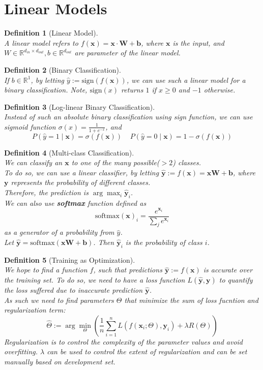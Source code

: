 \documentclass[12pt]{article}
\newtheorem{definition}{Definition}[section]
\theoremstyle{definition}
\newcommand{\x}{\mathbf{x}}
\newcommand{\y}{\mathbf{y}}
\begin{document}
\section{Linear Models}
\begin{definition}[Linear Model]
\hfill\\\normalfont A linear model refers to $f(\x) = \x\cdot \mathbf{W} + \mathbf{b}$, where $\x$ is the input, and $W\in\mathbb{R}^{d_{in}\times d_{out}}, b\in\mathbb{R}^{d_{out}}$ are parameter of the linear model.
\end{definition}
\begin{definition}[Binary Classification]
\hfill\\\normalfont If $b\in\mathbb{R}^1$, by letting $\hat{y}:=\text{sign}(f(\x))$, we can use such a linear model for a binary classification. Note, $\text{sign}(x)$ returns $1$ if $x\geq 0$ and $-1$ otherwise.
\end{definition} 
\begin{definition}[Log-linear Binary Classification]
\hfill\\\normalfont Instead of such an absolute binary classification using sign function, we can use sigmoid function $\sigma(x)=\frac{1}{1+e^{-x}}$, and
\[
P(\hat{y}=1\mid \x)=\sigma(f(\x))\;\;\;\;P(\hat{y}=0\mid \x)= 1-\sigma(f(\x))
\]
\end{definition}
\begin{definition}[Multi-class Classification]
\hfill\\\normalfont We can classify an $\x$ to one of the many possible($>2$) classes. \\
To do so, we can use a linear classifier, by letting $\hat{\y}:=f(\x)=\x\mathbf{W}+\mathbf{b}$, where $\y$ represents the probability of different classes. \\
Therefore, the prediction is $\arg\max_i \hat{\y}_i$.\\

We can also use \textbf{softmax} function defined as
\[
\text{softmax}(\x)_i = \frac{e^{\x_i}}{\sum_{j}e^{\x_i}}
\]
as a generator of a probability from $\hat{y}$.\\
Let $\hat{\y}=\text{softmax}(\x\mathbf{W}+\mathbf{b})$. Then $\hat{\y}_i$ is the probability of class $i$.
\end{definition}
\begin{definition}[Training as Optimization]
\hfill\\\normalfont We hope to find a function $f$, such that predictions $\hat{\y}:=f(\x)$ is accurate over the training set. To do so, we need to have a loss function $L(\hat{\y},\y)$ to quantify the loss suffered due to inaccurate prediction $\hat{\y}$.\\
As such we need to find parameters $\Theta$ that minimize the sum of loss fucntion and regularization term:
\[
\hat{\Theta}:=\arg\min_{\Theta}(\frac{1}{n}\sum_{i=1}^n L(f(\x_i;\Theta), \y_i)+\lambda R(\Theta))
\]
Regularization is to control the complexity of the parameter values and avoid overfitting. $\lambda$ can be used to control the extent of regularization and can be set manually based on development set.
\end{definition}
\end{document}
